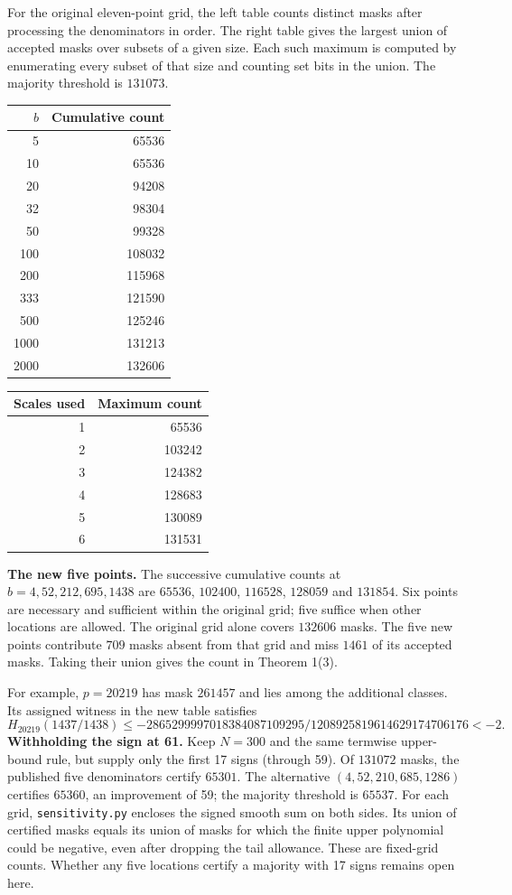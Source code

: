 \documentclass[11pt]{article}
\begin{document}
For the original eleven-point grid, the left table counts distinct masks after processing the denominators in order. The right table gives the largest union of accepted masks over subsets of a given size. Each such maximum is computed by enumerating every subset of that size and counting set bits in the union. The majority threshold is $131073$.

\begin{center}\small
\begin{tabular}[t]{rr}
\toprule $b$ & Cumulative count\\\midrule
5&65536\\10&65536\\20&94208\\32&98304\\50&99328\\100&108032\\200&115968\\333&121590\\500&125246\\1000&131213\\2000&132606\\\bottomrule
\end{tabular}\hspace{1cm}
\begin{tabular}[t]{rr}
\toprule Scales used & Maximum count\\\midrule
1&65536\\2&103242\\3&124382\\4&128683\\5&130089\\6&131531\\\bottomrule
\end{tabular}
\end{center}


\textbf{The new five points.} The successive cumulative counts at $b=4,52,212,695,1438$ are $65536$, $102400$, $116528$, $128059$ and $131854$. Six points are necessary and sufficient within the original grid; five suffice when other locations are allowed. The original grid alone covers $132606$ masks. The five new points contribute $709$ masks absent from that grid and miss $1461$ of its accepted masks. Taking their union gives the count in Theorem 1(3).

For example, $p=20219$ has mask $261457$ and lies among the additional classes. Its assigned witness in the new table satisfies
\[
 H_{20219}(1437/1438)\le
 -2865299997018384087109295/1208925819614629174706176<-2 .
\]
\textbf{Withholding the sign at 61.} Keep $N=300$ and the same termwise upper-bound rule, but supply only the first 17 signs (through 59). Of $131072$ masks, the published five denominators certify $65301$. The alternative $(4,52,210,685,1286)$ certifies $65360$, an improvement of 59; the majority threshold is $65537$. For each grid, \texttt{sensitivity.py} encloses the signed smooth sum on both sides. Its union of certified masks equals its union of masks for which the finite upper polynomial could be negative, even after dropping the tail allowance. These are fixed-grid counts. Whether any five locations certify a majority with 17 signs remains open here.
\end{document}
